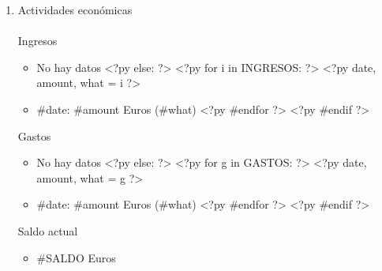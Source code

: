 \documentclass[a4paper,12pt]{report}
\begin{document}
\begin{enumerate}
\begin{itemize}
\end{itemize}
\newpage
\item \textsf {\Large Actividades económicas}
\\
\\
\textsf{Ingresos}

\begin{itemize}
<?py if len(INGRESOS) == 0: ?>
\item No hay datos
<?py else: ?>
<?py     for i in INGRESOS: ?>
<?py         date, amount, what = i ?>
\item #{date}: #{amount} Euros (#{what})
<?py     #endfor ?>
<?py #endif ?>
\end{itemize}

\textsf{Gastos}

\begin{itemize}
<?py if len(GASTOS) == 0: ?>
\item No hay datos
<?py else: ?>
<?py     for g in GASTOS: ?>
<?py         date, amount, what = g ?>
\item #{date}: #{amount} Euros (#{what})
<?py     #endfor ?>
<?py #endif ?>
\end{itemize}

\textsf{Saldo actual}

\begin{itemize}
\item #{SALDO} Euros
\end{itemize}


\end{enumerate}
\end{document}
